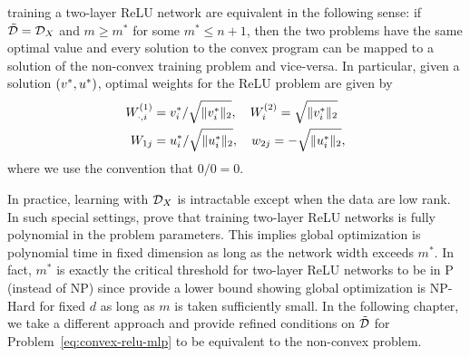 training a two-layer ReLU network are equivalent in the following sense:
if \( \tilde {\mathcal{D}} = \mathcal{D}_X \) and \( m \geq m^* \) for some \( m^* \leq n + 1 \),
then the two problems have the same optimal value and every solution to the
convex program can be mapped to a solution of the non-convex training problem
and vice-versa.
In particular, given a solution \( \left(v^*, u^*\right) \), optimal weights
for the ReLU problem are given by
\begin{equation}\label{eq:convex-to-relu}
    \begin{aligned}
        W^{(1)}_{\cdot, i} 
        & = v_i^*/ \sqrt{\|v_i^*\|_2}, \quad W^{(2)}_{i} = \sqrt{\|v_i^*\|_2}
        \\
        W_{1j}             
        & = u_i^*/ \sqrt{\|u_i^*\|_2}, \quad w_{2j} = -\sqrt{\|u_i^*\|_2},
    \end{aligned}
\end{equation}
where we use the convention that \( 0/0 = 0 \).

In practice, learning with \( \mathcal{D}_{X} \) is intractable except when the data
are low rank.
In such special settings, \citet{pilanci2020convexnn} prove that training two-layer
ReLU networks is fully polynomial in the problem parameters.
This implies global optimization is polynomial time in fixed dimension as long
as the network width exceeds \( m^* \).
In fact, \( m^* \) is exactly the critical threshold for two-layer ReLU
networks to be in P (instead of NP) since \citet{froese2023hard} provide a lower
bound showing global optimization is NP-Hard for fixed \( d \) as long as
\( m \) is taken sufficiently small.
In the following chapter, we take a different approach and provide refined
conditions on \( \tilde{\mathcal{D}} \) for Problem~\ref{eq:convex-relu-mlp} to be
equivalent to the non-convex problem.

